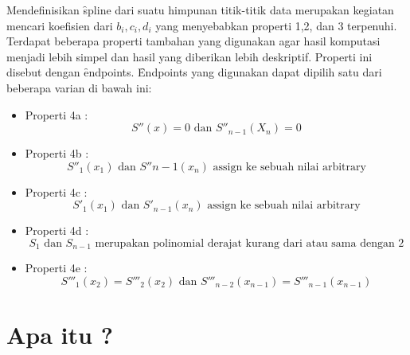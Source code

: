 Mendefinisikan \f{spline} dari suatu himpunan titik-titik data merupakan kegiatan mencari koefisien dari $b_i, c_i, d_i$ yang menyebabkan properti 1,2, dan 3 terpenuhi. Terdapat beberapa properti tambahan yang digunakan agar hasil komputasi menjadi lebih simpel dan hasil yang diberikan lebih deskriptif. Properti ini disebut dengan \f{endpoints}. \f{Endpoints} yang digunakan dapat dipilih satu dari beberapa varian di bawah ini:
\begin{itemize}
	\item Properti 4a  : \[ S''(x) = 0 \text{  dan  } S''_{n-1}(X_n) = 0\]
	\item Properti 4b  : \[ S''_{1}(x_1) \text{  dan  }  S''{n-1}(x_n) \text{ assign ke sebuah nilai arbitrary}\]
	\item Properti 4c  : \[ S'_{1}(x_1) \text{  dan  } S'_{n-1}(x_n) \text{  assign ke sebuah nilai arbitrary}\]
	\item Properti 4d  : \[  S_{1} \text{ dan } S_{n-1} \text{ merupakan polinomial derajat kurang dari atau sama dengan 2}\]
	\item Properti 4e  :\[ S'''_{1}(x_2) = S'''_{2}(x_2) \text{  dan  } S'''_{n-2}(x_{n-1}) = S'''_{n-1}(x_{n-1}) \]
\end{itemize}

\section{Apa itu \latex?}
\label{sec:latex}


